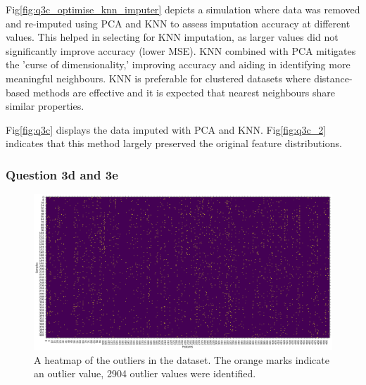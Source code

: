     Fig\eqref{fig:q3c_optimise_knn_imputer} depicts a simulation where data was removed and re-imputed using PCA and
    KNN to assess imputation accuracy at different  values.
    This helped in selecting  for KNN imputation, as larger  values did not significantly
    improve accuracy (lower MSE).
    KNN combined with PCA mitigates the 'curse of dimensionality,' improving accuracy \cite{bellman1957} and aiding in
    identifying more meaningful neighbours.
    KNN is preferable for clustered datasets where distance-based methods are effective and it is expected that nearest
    neighbours share similar properties.

    Fig\eqref{fig:q3c} displays the data imputed with PCA and KNN.
    Fig\eqref{fig:q3c_2} indicates that this method largely preserved the original feature distributions.

\subsubsection{Question 3d and 3e}\label{subsubsec:q3de}
    \begin{figure}[htb]
    \centering
    \includegraphics[width=1\textwidth]{./figures/q3d_heatmap}
    \caption{A heatmap of the outliers in the  dataset. The orange marks indicate an
        outlier value, 2904 outlier values were identified.}
    \label{fig:q3d_heatmap}
    \end{figure}


